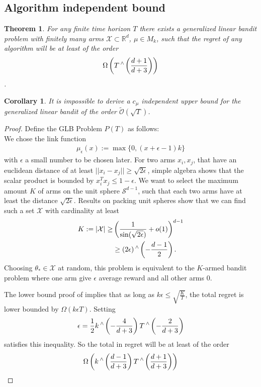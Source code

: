 \documentclass[twoside]{article} \usepackage{aistats2017}
\DeclareMathOperator\caret{\raisebox{1ex}{$\scriptstyle\wedge$}}
\newtheorem{theorem}{Theorem}
\newtheorem{corollary}{Corollary}[theorem]
\begin{document}
\subsection{Algorithm independent bound}
\begin{theorem}
For any finite time horizon $T$ there exists a generalized linear bandit problem with finitely many arms $\mathcal{X}\subset\mathbb{R}^d$, $\mu\in M_k$, such that the regret of any algorithm will be at least of the order
$$\Omega\left(T\caret\left(\frac{d+1}{d+3}\right)\right)$$.
\end{theorem}
\begin{corollary}
It is impossible to derive a $c_\mu$ independent upper bound for the generalized linear bandit of the order $\tilde{\mathcal{O}}(\sqrt{T})$.
\end{corollary}
\begin{proof}
    Define the GLB Problem $P(T)$ as follows:\\
    We chose the link function 
    \begin{align}
        \mu_\epsilon(x) := \max\{0, (x+\epsilon-1)k\}
    \end{align}
    with $\epsilon$ a small number to be chosen later. For two arms $x_i,x_j$, that have an euclidean distance of at least $||x_i-x_j||\geq\sqrt{2\epsilon}$, simple algebra shows that the scalar product is bounded by $x_i^Tx_j \leq 1-\epsilon$. We want to select the maximum amount $K$ of arms on the unit sphere $\mathcal{S}^{d-1}$, such that each two arms have at least the distance $\sqrt{2\epsilon}$. Results on packing
     unit spheres \cite{shannon59} \cite{wyner65} show that we can find such a set $\mathcal{X}$ with cardinality at least
     \begin{align*}
     K:=|\mathcal{X}| \geq& \left(\frac{1}{\sin(\sqrt{2\epsilon})}+o(1)\right)^{d-1}\\
     &\geq (2\epsilon)\caret\left(-\frac{d-1}{2}\right).
     \end{align*}
     Choosing $\theta_*\in \mathcal{X}$ at random, this problem is equivalent to the $K$-armed bandit problem where one arm give $\epsilon$ average reward and all other arms $0$.
     
     The lower bound proof of \cite{Auer} implies that as long as $k\epsilon\leq \sqrt{\frac{K}{T}}$, the total regret is lower bounded by $\Omega(k\epsilon T)$. Setting
     $$\epsilon = \frac{1}{2}k\caret\left(-\frac{4}{d+3}\right)T\caret\left(-\frac{2}{d+3}\right)$$
     satisfies this inequality. So the total in regret will be at least of the order
     $$\Omega \left(k\caret\left(\frac{d-1}{d+3}\right)T\caret\left(\frac{d+1}{d+3}\right)\right)$$
    
\end{proof}
\end{document}
